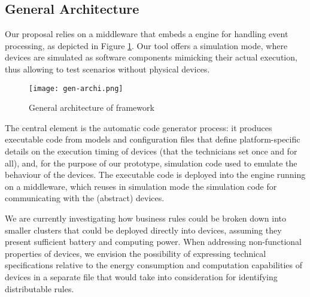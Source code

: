 \subsection{General Architecture}
\label{sec:CG-Architecture}

Our proposal relies on a middleware that embeds a \CEP engine for handling event processing, as depicted in Figure \ref{fig:Architecture}. Our tool offers a simulation mode, where devices are simulated as software components mimicking their actual execution, thus allowing to test \IOT scenarios without physical devices.

\begin{figure}%
	\centering  
	\texttt{[image: gen-archi.png]}%
	\caption{General architecture of \IOTDSL framework}%
	\label{fig:Architecture}%
\end{figure}

The central element is the automatic code generator process: it produces executable code from \IOTDSL models and configuration files that define platform-specific details on the execution timing of devices (that the technicians set once and for all), and, for the purpose of our prototype, simulation code used to emulate the behaviour of the devices. The executable code is deployed into the \CEP engine running on a middleware, which reuses in simulation mode the simulation code for communicating with the (abstract) devices. 


We are currently investigating how business rules could be broken down into smaller clusters that could be deployed directly into devices, assuming they present sufficient battery and computing power. When addressing non-functional properties of devices, we envision the possibility of expressing technical specifications relative to the energy consumption and computation capabilities of devices in a separate file that \IOTDSL would take into consideration for identifying distributable rules.

